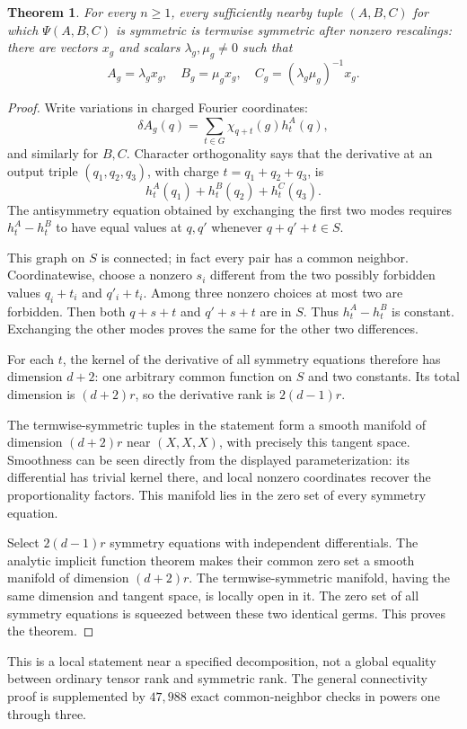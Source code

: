 \documentclass[11pt]{article}
\newtheorem{theorem}{Theorem}[section]
\theoremstyle{definition}\newtheorem{definition}[theorem]{Definition}
\begin{document}
\begin{theorem}\label{thm:localsym}
For every $n\ge1$, every sufficiently nearby tuple $(A,B,C)$ for which $\Psi(A,B,C)$ is symmetric is termwise symmetric after nonzero rescalings: there are vectors $x_g$ and scalars $\lambda_g,\mu_g\ne0$ such that
\[
A_g=\lambda_gx_g,\quad B_g=\mu_gx_g,
\quad C_g=(\lambda_g\mu_g)^{-1}x_g.
\]
\end{theorem}
\begin{proof}
Write variations in charged Fourier coordinates:
\[
\delta A_g(q)=\sum_{t\in G}\chi_{q+t}(g)h^A_t(q),
\]
and similarly for $B,C$. Character orthogonality says that the derivative at an output triple $(q_1,q_2,q_3)$, with charge $t=q_1+q_2+q_3$, is
\[
h^A_t(q_1)+h^B_t(q_2)+h^C_t(q_3).
\]
The antisymmetry equation obtained by exchanging the first two modes requires $h^A_t-h^B_t$ to have equal values at $q,q'$ whenever $q+q'+t\in S$.

This graph on $S$ is connected; in fact every pair has a common neighbor. Coordinatewise, choose a nonzero $s_i$ different from the two possibly forbidden values $q_i+t_i$ and $q'_i+t_i$. Among three nonzero choices at most two are forbidden. Then both $q+s+t$ and $q'+s+t$ are in $S$. Thus $h^A_t-h^B_t$ is constant. Exchanging the other modes proves the same for the other two differences.

For each $t$, the kernel of the derivative of all symmetry equations therefore has dimension $d+2$: one arbitrary common function on $S$ and two constants. Its total dimension is $(d+2)r$, so the derivative rank is $2(d-1)r$.

The termwise-symmetric tuples in the statement form a smooth manifold of dimension $(d+2)r$ near $(X,X,X)$, with precisely this tangent space. Smoothness can be seen directly from the displayed parameterization: its differential has trivial kernel there, and local nonzero coordinates recover the proportionality factors. This manifold lies in the zero set of every symmetry equation.

Select $2(d-1)r$ symmetry equations with independent differentials. The analytic implicit function theorem makes their common zero set a smooth manifold of dimension $(d+2)r$. The termwise-symmetric manifold, having the same dimension and tangent space, is locally open in it. The zero set of all symmetry equations is squeezed between these two identical germs. This proves the theorem.
\end{proof}
This is a local statement near a specified decomposition, not a global equality between ordinary tensor rank and symmetric rank. The general connectivity proof is supplemented by $47,988$ exact common-neighbor checks in powers one through three.
\end{document}
